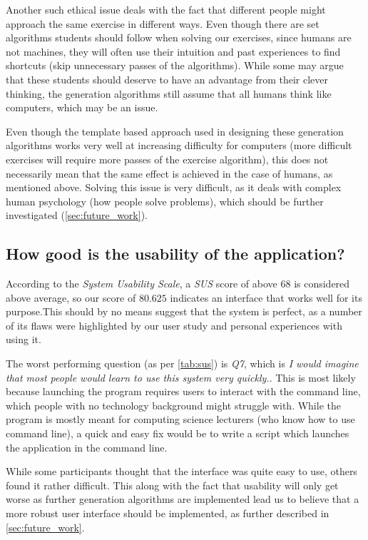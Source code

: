 \documentclass{l4proj}
\begin{document}
Another such ethical issue deals with the fact that different people might approach the same exercise in different ways. Even though there are set algorithms students should follow when solving our exercises, since humans are not machines, they will often use their intuition and past experiences to find shortcuts (skip unnecessary passes of the algorithms). While some may argue that these students should deserve to have an advantage from their clever thinking, the generation algorithms still assume that all humans think like computers, which may be an issue.

Even though the template based approach used in designing these generation algorithms works very well at increasing difficulty for computers (more difficult exercises will require more passes of the exercise algorithm), this does not necessarily mean that the same effect is achieved in the case of humans, as mentioned above. Solving this issue is very difficult, as it deals with complex human psychology (how people solve problems), which should be further investigated (\autoref{sec:future_work}).

\subsection*{How good is the usability of the application?}

According to the \emph{System Usability Scale}, a \emph{SUS} score of above $68$ is considered above average, so our score of $80.625$ indicates an interface that works well for its purpose.This should by no means suggest that the system is perfect, as a number of its flaws were highlighted by our user study and personal experiences with using it.

The worst performing question (as per \autoref{tab:sus}) is \emph{Q7}, which is \emph{I would imagine that most people would learn to use this system very quickly.}. This is most likely because launching the program requires users to interact with the command line, which people with no technology background might struggle with. While the program is mostly meant for computing science lecturers (who know how to use command line), a quick and easy fix would be to write a script which launches the application in the command line.

While some participants thought that the interface was quite easy to use, others found it rather difficult. This along with the fact that usability will only get worse as further generation algorithms are implemented lead us to believe that a more robust user interface should be implemented, as further described in \autoref{sec:future_work}.
\end{document}

